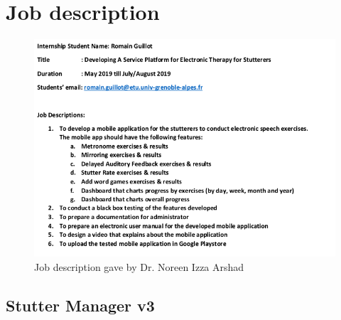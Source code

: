 \begin{appendices}

\chapter{Job description}
\label{appendix:description}

\begin{figure}[h]
  \includegraphics[width=1\linewidth]{content/imgs/description.png}
  \caption*{Job description gave by Dr. Noreen Izza Arshad}
\end{figure}


\begin{landscape}
\chapter{Stutter Manager v3}
\label{appendix:old_app}


\end{landscape}
\end{appendices}
